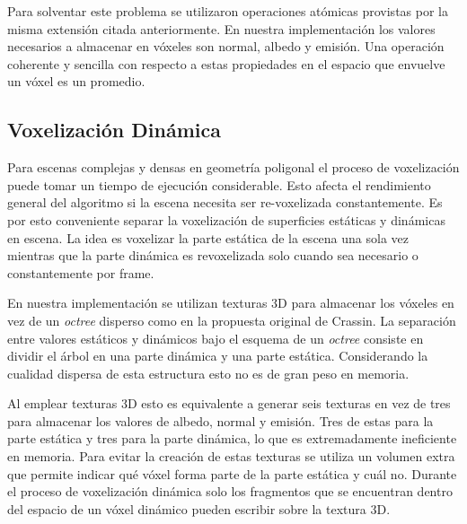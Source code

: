 Para solventar este problema se utilizaron operaciones atómicas provistas por la misma extensión citada anteriormente. En nuestra implementación los valores necesarios a almacenar en vóxeles son normal, albedo y emisión. Una operación coherente y sencilla con respecto a estas propiedades en el espacio que envuelve un vóxel es un promedio.

\subsection{Voxelización Dinámica} %
\label{sub:voxelizacion_dinamica}
Para escenas complejas y densas en geometría poligonal el proceso de voxelización puede tomar un tiempo de ejecución considerable. Esto afecta el rendimiento general del algoritmo si la escena necesita ser re-voxelizada constantemente. Es por esto conveniente separar la voxelización de superficies estáticas y dinámicas en escena. La idea es voxelizar la parte estática de la escena una sola vez mientras que la parte dinámica es revoxelizada solo cuando sea necesario o constantemente por frame.

En nuestra implementación se utilizan texturas 3D para almacenar los vóxeles en vez de un \emph{octree} disperso como en la propuesta original de Crassin. La separación entre valores estáticos y dinámicos bajo el esquema de un \emph{octree} consiste en dividir el árbol en una parte dinámica y una parte estática. Considerando la cualidad dispersa de esta estructura esto no es de gran peso en memoria. 

Al emplear texturas 3D esto es equivalente a generar seis texturas en vez de tres para almacenar los valores de albedo, normal y emisión. Tres de estas para la parte estática y tres para la parte dinámica, lo que es extremadamente ineficiente en memoria. Para evitar la creación de estas texturas se utiliza un volumen extra que permite indicar qué vóxel forma parte de la parte estática y cuál no. Durante el proceso de voxelización dinámica solo los fragmentos que se encuentran dentro del espacio de un vóxel dinámico pueden escribir sobre la textura 3D.
